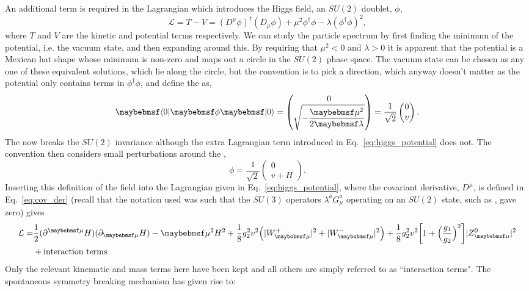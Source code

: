 An additional term is required in the \SM Lagrangian which introduces the Higgs field, an $SU(2)$ doublet, $\phi$,
\begin{equation}
  \mathcal{L} = T - V = (D^{\mu}\phi)^{\dagger}(D_{\mu}\phi) + \mu^{2}\phi^{\dagger}\phi - \lambda(\phi^{\dagger}\phi)^{2},
  \label{eq:higgs_potential}
\end{equation}
where $T$ and $V$ are the kinetic and potential terms respectively. We can study the particle spectrum by first finding the minimum of the potential, i.e. the vacuum state, and then expanding around this. By requiring that $\mu^{2}<0$ and $\lambda>0$ it is apparent that the potential is a Mexican hat shape whose minimum is non-zero and maps out a circle in the $SU(2)$ phase space. The vacuum state can be chosen as any one of these equivalent solutions, which lie along the circle, but the convention is to pick a direction, which anyway doesn't matter as the potential only contains terms in $\phi^{\dagger}\phi$, and define the \VEV as,
\begin{equation}
  \bra{0}\phi\ket{0} = \begin{pmatrix} 0 \\ \sqrt{-\dfrac{\mu^{2}}{2\lambda}} \end{pmatrix} = \frac{1}{\sqrt{2}} \begin{pmatrix} 0 \\ v \end{pmatrix}.
\end{equation}
The \VEV now breaks the $SU(2)$ invariance although the extra Lagrangian term introduced in Eq.~\ref{eq:higgs_potential} does not. The convention then considers small perturbations around the \VEV,
\begin{equation}
  \phi = \dfrac{1}{\sqrt{2}}\begin{pmatrix} 0 \\ v+H \end{pmatrix}.
\end{equation}
Inserting this definition of the field \phi into the Lagrangian given in Eq.~\ref{eq:higgs_potential}, where the covariant derivative, $D^{\mu}$, is defined in Eq.~\ref{eq:cov_der} (recall that the notation used was such that the $SU(3)$ operators $\lambda^{a}G^{a}_{\mu}$ operating on an $SU(2)$ state, such as \phi, gave zero) gives
\begin{align}
  \mathcal{L} = & \frac{1}{2}(\partial^{\mu}H)(\partial_{\mu}H) - \mu^{2}H^{2} + \frac{1}{8}g_{2}^{2}v^{2}\Bigl(|W_{\mu}^{+}|^{2}+|W_{\mu}^{-}|^{2}\Bigr) +\frac{1}{8}g_{2}^{2}v^{2}\biggl[1+\Bigl(\frac{g_{1}}{g_{2}}\Bigr)^{2}\biggr]|Z^{0}_{\mu}|^{2} \nonumber\\
  & + \mbox{interaction terms}
\end{align}
Only the relevant kinematic and mass terms here have been kept and all others are simply referred to as ``interaction terms". The spontaneous symmetry breaking mechanism has given rise to:

